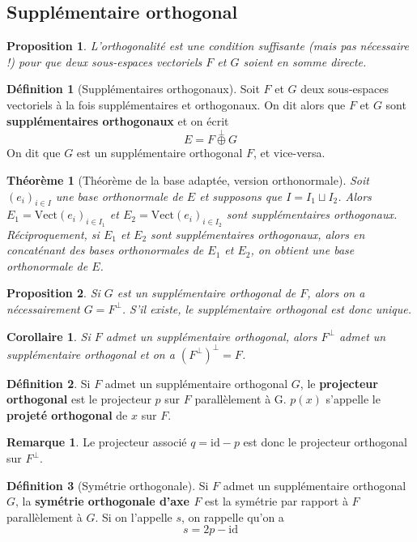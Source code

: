 \documentclass[french]{article}
\newcommand{\id}{\text{id}}
\newcommand{\vect}{\text{Vect}}
\theoremstyle{plain}
\newtheorem{thm}{Théorème}
\newtheorem{prop}{Proposition}
\newtheorem{cor}{Corollaire}
\theoremstyle{definition}
\newtheorem{dfn}{Définition}
\newtheorem{rmq}{Remarque}
\begin{document}
\subsection{Supplémentaire orthogonal}
\begin{prop}
	L'orthogonalité est une condition suffisante (mais pas nécessaire !) pour que deux sous-espaces vectoriels $F$ et $G$ soient en somme directe.
\end{prop}
\begin{dfn}[Supplémentaires orthogonaux]
	Soit $F$ et $G$ deux sous-espaces vectoriels à la fois supplémentaires et orthogonaux. On dit alors que $F$ et $G$ sont \textbf{supplémentaires orthogonaux} et on écrit $$E=F\overset{\perp}{\oplus} G$$ On dit que $G$ est un supplémentaire orthogonal $F$, et vice-versa.
\end{dfn}
\begin{thm}[Théorème de la base adaptée, version orthonormale]
	Soit $(e_i)_{i\in I}$ une base orthonormale de $E$ et supposons que $I=I_1\sqcup I_2$. Alors $E_1=\vect(e_i)_{i\in I_1}$ et $E_2=\vect(e_i)_{i\in I_2}$ sont supplémentaires orthogonaux. Réciproquement, si $E_1$ et $E_2$ sont supplémentaires orthogonaux, alors en concaténant des bases orthonormales de $E_1$ et $E_2$, on obtient une base orthonormale de $E$.
\end{thm}
\begin{prop}
	Si $G$ est un supplémentaire orthogonal de $F$, alors on a nécessairement $G=F^\perp$. S'il existe, le supplémentaire orthogonal est donc unique.
\end{prop}
\begin{cor}
	Si $F$ admet un supplémentaire orthogonal, alors $F^\perp$ admet un supplémentaire orthogonal et on a $(F^\perp)^\perp=F$. 
\end{cor}
\begin{dfn}
	Si $F$ admet un supplémentaire orthogonal $G$, le \textbf{projecteur orthogonal} est le projecteur $p$ sur $F$ parallèlement à G. $p(x)$ s'appelle le \textbf{projeté orthogonal} de $x$ sur $F$.
\end{dfn}
\begin{rmq} Le projecteur associé $q=\id-p$ est donc le projecteur orthogonal sur $F^\perp$. \end{rmq}
\begin{dfn}[Symétrie orthogonale]
	Si $F$ admet un supplémentaire orthogonal $G$, la \textbf{symétrie orthogonale d'axe $F$} est la symétrie par rapport à $F$ parallèlement à $G$. Si on l'appelle $s$, on rappelle qu'on a $$s=2p-\id$$
\end{dfn}
\end{document}
